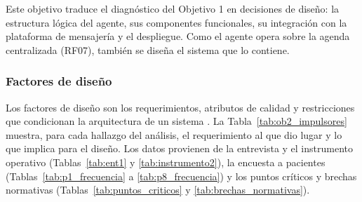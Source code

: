 Este objetivo traduce el diagnóstico del Objetivo 1 en decisiones de diseño: la estructura lógica del agente, sus componentes funcionales, su integración con la plataforma de mensajería y el despliegue. Como el agente opera sobre la agenda centralizada (RF07), también se diseña el sistema que lo contiene.

\subsubsection{Factores de diseño}

Los factores de diseño son los requerimientos, atributos de calidad y restricciones que condicionan la arquitectura de un sistema \cite{cervantes2016designing}. La Tabla~\ref{tab:ob2_impulsores} muestra, para cada hallazgo del análisis, el requerimiento al que dio lugar y lo que implica para el diseño. Los datos provienen de la entrevista y el instrumento operativo (Tablas~\ref{tab:ent1} y \ref{tab:instrumento2}), la encuesta a pacientes (Tablas~\ref{tab:p1_frecuencia} a \ref{tab:p8_frecuencia}) y los puntos críticos y brechas normativas (Tablas~\ref{tab:puntos_criticos} y \ref{tab:brechas_normativas}).

